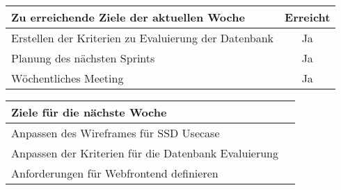 \begin{tabularx}{\textwidth}{Xc}
    \arrayrulecolor{OliveGreen}
    \toprule
    {\bfseries Zu erreichende Ziele der aktuellen Woche} & {\bfseries Erreicht} \\
    \midrule[2pt]
    Erstellen der Kriterien zu Evaluierung der Datenbank  &Ja                \\
    \rowcolor{OliveGreen!15}
    Planung des nächsten Sprints                          &Ja                \\
    \rowcolor{OliveGreen!15}
    Wöchentliches Meeting                                 &Ja                \\
   \bottomrule[2pt]
\end{tabularx}
%
\vspace{1cm}
%
\begin{tabularx}{\textwidth}{Xc}
    \arrayrulecolor{OliveGreen}
    \toprule
    {\bfseries Ziele für die nächste Woche}              &                   \\
    \midrule[2pt]
    Anpassen des Wireframes für SSD Usecase              &                   \\
    \rowcolor{OliveGreen!15}
    Anpassen der Kriterien für die Datenbank Evaluierung &                   \\
    \rowcolor{OliveGreen!15}
    Anforderungen für Webfrontend definieren             &                   \\
\end{tabularx}

